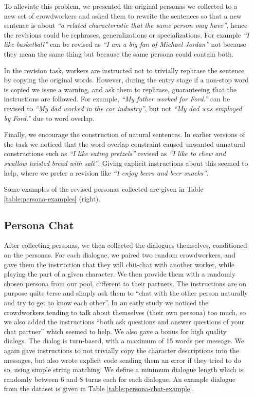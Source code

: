 \documentclass[11pt,a4paper]{article}
\begin{document}
To alleviate this problem, we presented the original personas we collected to a new set of crowdworkers
and asked them to rewrite the sentences so that a new sentence is about 
{\em ``a related characteristic that the same person may have''},
hence the revisions could be rephrases, generalizations or specializations.
For example {\em ``I like basketball''} can be revised as {\em ``I am a big fan of Michael Jordan''}
not because they mean the same thing but because the same persona could contain both. 

In the revision task, workers are instructed not to trivially rephrase the sentence by copying the original words.
However, during the entry stage if a non-stop word is copied we issue a
warning, and ask them to rephrase, guaranteeing that the instructions are followed. 
For example, {\em ``My father worked for Ford.''} can be revised to
{\em ``My dad worked in the car industry''}, but not
{\em ``My dad was employed by Ford.''} due to word overlap.

\ifarxiv
Finally, we encourage the construction of  natural sentences. In earlier versions of the task we noticed that
the word overlap constraint caused unwanted unnatural constructions such as {\em ``I like eating pretzels''} revised as
{\em ``I like to chew and swallow twisted bread with salt''}. Giving explicit instructions about this seemed to help,
where we prefer a revision like {\em ``I enjoy beers and beer snacks''}.
\fi

Some examples of the revised personas collected are given in Table \ref{table:persona-examples} (right).


\subsection{Persona Chat}\label{personachatter}

After collecting personas, we then collected the dialogues themselves, conditioned on the personas.
For each dialogue, we paired two random crowdworkers, and gave them the instruction that they will chit-chat with another worker, while
playing the part of a given character. We then provide them with a randomly chosen persona from our pool, different to their partners.
The instructions are on purpose quite terse and simply ask them to 
``chat with the other person naturally and try to get to know each other''.
In an early study we noticed the crowdworkers tending to talk about themselves (their own persona) too much, so
we also added the instructions
``both ask questions and answer questions of your chat partner'' which seemed to help.
We also gave a bonus for high quality dialogs.
The dialog is turn-based, with a maximum of 15 words per message.
We again gave instructions to not  trivially copy the character descriptions into the messages,
but also wrote explicit code sending them an error if they tried to do so, using simple string matching.
We define a minimum dialogue length which is randomly between 6 and 8 turns each for each dialogue.
An example dialogue from the dataset is given in Table  \ref{table:persona-chat-example}.
\end{document}
